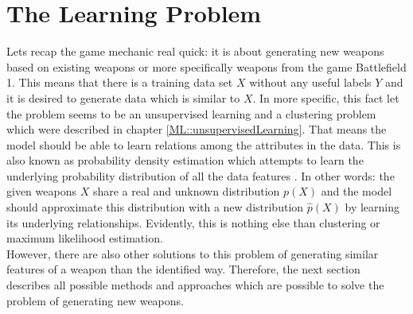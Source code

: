 \documentclass[MGS,Master,english]{twbook}%
\begin{document}
\section{The Learning Problem}
Lets recap the game mechanic real quick: it is about generating new weapons based on existing weapons or more specifically weapons from the game Battlefield 1. This means that there is a training data set $X$ without any useful labels $Y$ and it is desired to generate data which is similar to $X$. In more specific, this fact let the problem seems to be an unsupervised learning and a clustering problem which were described in chapter \ref{ML::unsupervisedLearning}. That means the model should be able to learn relations among the attributes in the data. This is also known as probability density estimation which attempts to learn the underlying probability distribution of all the data features \cite{ml::vae::tutorial}. In other words: the given weapons $X$ share a real and unknown distribution $p(X)$ and the model should approximate this distribution with a new distribution $\hat{p}(X)$ by learning its underlying relationships. Evidently, this is nothing else than clustering or maximum likelihood estimation. \\
However, there are also other solutions to this problem of generating similar features of a weapon than the identified way. Therefore, the next section describes all possible methods and approaches which are possible to solve the problem of generating new weapons.
\end{document}
